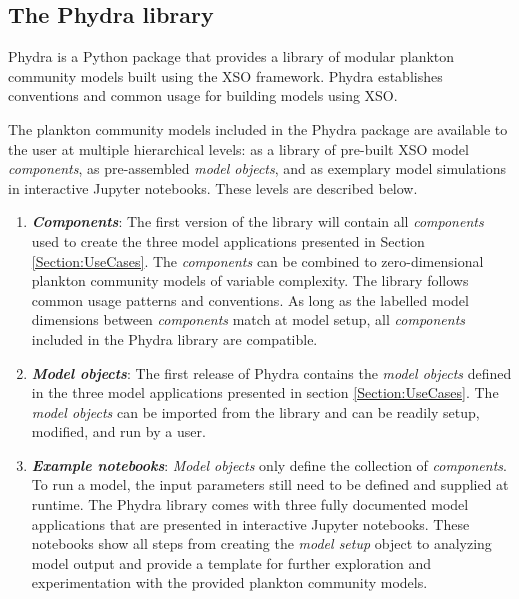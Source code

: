 \documentclass[gmd, manuscript]{copernicus}
\begin{document}
\subsection{The Phydra library} \label{Section:PhydraLibrary}
Phydra is a Python package that provides a library of modular plankton community models built using the XSO framework. Phydra establishes conventions and common usage for building models using XSO.

The plankton community models included in the Phydra package are available to the user at multiple hierarchical levels: as a library of pre-built XSO model \textit{components}, as pre-assembled \textit{model objects}, and as exemplary model simulations in interactive Jupyter notebooks. These levels are described below.

\begin{enumerate}
    \item \textbf{\textit{Components}}: The first version of the library will contain all \textit{components} used to create the three model applications presented in Section \ref{Section:UseCases}. The \textit{components} can be combined to zero-dimensional plankton community models of variable complexity. The library follows common usage patterns and conventions. As long as the labelled model dimensions between \textit{components} match at model setup, all \textit{components} included in the Phydra library are compatible.
    
    \item \textbf{\textit{Model objects}}: The first release of Phydra contains the \textit{model objects} defined in the three model applications presented in section \ref{Section:UseCases}. The \textit{model objects} can be imported from the library and can be readily setup, modified, and run by a user.
    
    \item \textbf{\textit{Example notebooks}}: \textit{Model objects} only define the collection of \textit{components}. To run a model, the input parameters still need to be defined and supplied at runtime. The Phydra library comes with three fully documented model applications that are presented in interactive Jupyter notebooks. These notebooks show all steps from creating the \textit{model setup} object to analyzing model output and provide a template for further exploration and experimentation with the provided plankton community models.
    
\end{enumerate}
\end{document}
